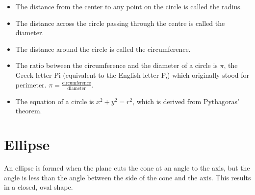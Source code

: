 \documentclass[12pt]{article}
\begin{document}
\begin{itemize}
\item The distance from the center to any point on the circle is called the radius.
\item The distance across the circle passing through the centre is called the diameter.
\item The distance around the circle is called the circumference.
\item The ratio between the circumference and the diameter of a circle is $\pi$, the Greek letter Pi (equivalent to the English letter P,) which originally stood for perimeter. $\pi=\frac{\textrm{circumference}}{\textrm{diameter}}$.\\

\begin{minipage}{0.48\textwidth}
\centering
{}
\end{minipage}
\hfill
\begin{minipage}{0.48\textwidth}
\centering
{}
\end{minipage}

\item The equation of a circle is $x^2 + y^2 = r^2$, which is derived from Pythagoras' theorem.
\end{itemize}

\newpage

\section*{Ellipse}
An ellipse is formed when the plane cuts the cone at an angle to the axis, but the angle is less than the angle between the side of the cone and the axis. This results in a closed, oval shape.
\end{document}
